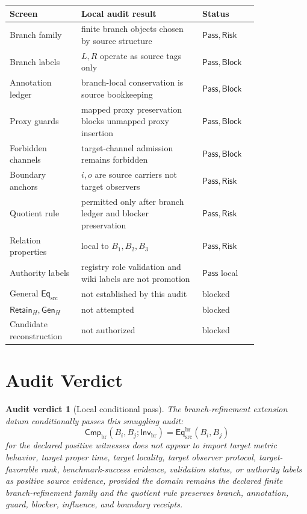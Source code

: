 \documentclass[11pt]{article}
\newcommand{\EqSrc}{\mathsf{Eq}_{\mathrm{src}}}
\newcommand{\EqBr}{\mathsf{Eq}_{\mathrm{src}}^{\mathrm{br}}}
\newcommand{\InvBr}{\mathsf{Inv}_{\mathrm{br}}}
\newcommand{\CmpBr}{\mathsf{Cmp}_{\mathrm{br}}}
\newcommand{\RetainH}{\mathsf{Retain}_{H}}
\newcommand{\GenH}{\mathsf{Gen}_{H}}
\newcommand{\Pass}{\mathsf{Pass}}
\newcommand{\Block}{\mathsf{Block}}
\newcommand{\Risk}{\mathsf{Risk}}
\newtheorem{auditverdict}{Audit verdict}
\begin{document}
\begin{center}
\begin{tabular}{p{0.23\linewidth}p{0.41\linewidth}p{0.18\linewidth}}
\textbf{Screen} & \textbf{Local audit result} & \textbf{Status} \\
\hline
Branch family & finite branch objects chosen by source structure & \(\Pass,\Risk\) \\
Branch labels & \(L,R\) operate as source tags only & \(\Pass,\Block\) \\
Annotation ledger & branch-local conservation is source bookkeeping & \(\Pass,\Block\) \\
Proxy guards & mapped proxy preservation blocks unmapped proxy insertion & \(\Pass,\Block\) \\
Forbidden channels & target-channel admission remains forbidden & \(\Pass,\Block\) \\
Boundary anchors & \(i,o\) are source carriers not target observers & \(\Pass,\Risk\) \\
Quotient rule & permitted only after branch ledger and blocker preservation & \(\Pass,\Risk\) \\
Relation properties & local to \(B_{1},B_{2},B_{3}\) & \(\Pass,\Risk\) \\
Authority labels & registry role validation and wiki labels are not promotion & \(\Pass\) local \\
General \(\EqSrc\) & not established by this audit & blocked \\
\(\RetainH,\GenH\) & not attempted & blocked \\
Candidate reconstruction & not authorized & blocked \\
\end{tabular}
\end{center}

\section{Audit Verdict}

\begin{auditverdict}[Local conditional pass]
The branch-refinement extension datum conditionally passes this smuggling
audit:
\[
    \CmpBr(B_i,B_j;\InvBr)=\EqBr(B_i,B_j)
\]
for the declared positive witnesses does not appear to import target
metric behavior, target proper time, target locality, target observer
protocol, target-favorable rank, benchmark-success evidence, validation
status, or authority labels as positive source evidence, provided the
domain remains the declared finite branch-refinement family and the
quotient rule preserves branch, annotation, guard, blocker, influence,
and boundary receipts.
\end{auditverdict}
\end{document}
